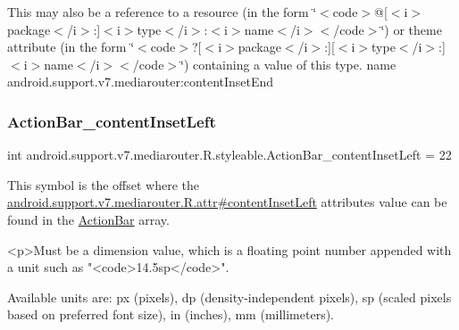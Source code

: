 This may also be a reference to a resource (in the form \char`\"{}$<$code$>$@\mbox{[}$<$i$>$package$<$/i$>$\+:\mbox{]}$<$i$>$type$<$/i$>$\+:$<$i$>$name$<$/i$>$$<$/code$>$\char`\"{}) or theme attribute (in the form \char`\"{}$<$code$>$?\mbox{[}$<$i$>$package$<$/i$>$\+:\mbox{]}\mbox{[}$<$i$>$type$<$/i$>$\+:\mbox{]}$<$i$>$name$<$/i$>$$<$/code$>$\char`\"{}) containing a value of this type.  name android.\+support.\+v7.\+mediarouter\+:content\+Inset\+End \mbox{\label{classandroid_1_1support_1_1v7_1_1mediarouter_1_1R_1_1styleable_a0fae6030af51792fafa6f48d490a69a4}} 
\subsubsection{\texorpdfstring{Action\+Bar\+\_\+content\+Inset\+Left}{ActionBar\_contentInsetLeft}}
{\footnotesize\ttfamily int android.\+support.\+v7.\+mediarouter.\+R.\+styleable.\+Action\+Bar\+\_\+content\+Inset\+Left = 22\hspace{0.3cm}{\ttfamily [static]}}

This symbol is the offset where the \hyperlink{classandroid_1_1support_1_1v7_1_1mediarouter_1_1R_1_1attr_a00da2882f3185a4fb35023d1fa0fb37a}{android.\+support.\+v7.\+mediarouter.\+R.\+attr\#content\+Inset\+Left} attribute\textquotesingle{}s value can be found in the \hyperlink{classandroid_1_1support_1_1v7_1_1mediarouter_1_1R_1_1styleable_adc4d3c0d096085367f12d025007aa53f}{Action\+Bar} array.

\begin{DoxyVerb}      <p>Must be a dimension value, which is a floating point number appended with a unit such as "<code>14.5sp</code>".
\end{DoxyVerb}
 Available units are\+: px (pixels), dp (density-\/independent pixels), sp (scaled pixels based on preferred font size), in (inches), mm (millimeters). 


